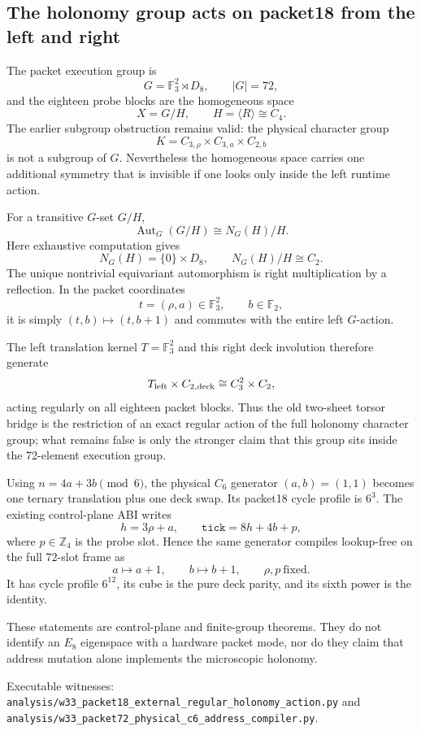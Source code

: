 \subsection{The holonomy group acts on packet18 from the left and right}
\label{sec:20260919-packet18-external-holonomy}

The packet execution group is
\[
G=\mathbb F_3^2\rtimes D_8,\qquad |G|=72,
\]
and the eighteen probe blocks are the homogeneous space
\[
X=G/H,\qquad H=\langle R\rangle\cong C_4.
\]
The earlier subgroup obstruction remains valid: the physical character group
\[
K=C_{3,\rho}\times C_{3,a}\times C_{2,b}
\]
is not a subgroup of $G$.  Nevertheless the homogeneous space carries one additional symmetry that is invisible if one looks only inside the left runtime action.

For a transitive $G$-set $G/H$,
\[
\operatorname{Aut}_G(G/H)\cong N_G(H)/H.
\]
Here exhaustive computation gives
\[
N_G(H)=\{0\}\times D_8,\qquad N_G(H)/H\cong C_2.
\]
The unique nontrivial equivariant automorphism is right multiplication by a reflection.  In the packet coordinates
\[
t=(\rho,a)\in\mathbb F_3^2,\qquad b\in\mathbb F_2,
\]
it is simply $(t,b)\mapsto(t,b+1)$ and commutes with the entire left $G$-action.

The left translation kernel $T=\mathbb F_3^2$ and this right deck involution therefore generate
\[
T_{\rm left}\times C_{2,\rm deck}\cong C_3^2\times C_2,
\]
acting regularly on all eighteen packet blocks. Thus the old two-sheet torsor bridge is the restriction of an exact regular action of the full holonomy character group; what remains false is only the stronger claim that this group sits inside the 72-element execution group.

Using $n=4a+3b\pmod 6$, the physical $C_6$ generator $(a,b)=(1,1)$ becomes one ternary translation plus one deck swap. Its packet18 cycle profile is $6^3$.
The existing control-plane ABI writes
\[
h=3\rho+a,\qquad \texttt{tick}=8h+4b+p,
\]
where $p\in\mathbb Z_4$ is the probe slot. Hence the same generator compiles lookup-free on the full 72-slot frame as
\[
a\mapsto a+1,\qquad b\mapsto b+1,\qquad \rho,p\ \text{fixed}.
\]
It has cycle profile $6^{12}$, its cube is the pure deck parity, and its sixth power is the identity.

These statements are control-plane and finite-group theorems. They do not identify an $E_8$ eigenspace with a hardware packet mode, nor do they claim that address mutation alone implements the microscopic holonomy.

Executable witnesses: \texttt{analysis/w33\_packet18\_external\_regular\_holonomy\_action.py} and \texttt{analysis/w33\_packet72\_physical\_c6\_address\_compiler.py}.
